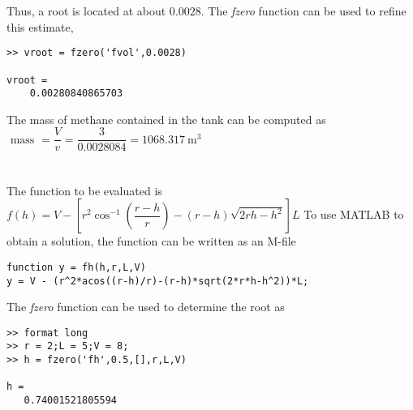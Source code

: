 \documentclass[../main.tex]{subfiles}
\begin{document}
\begin{enumerate}[label=\bfseries(\alph*)]
Thus, a root is located at about $0.0028$. The \textit {fzero} function can be used to refine this estimate,
\bigbreak
\begin{lstlisting}[numbers=none]
>> vroot = fzero('fvol',0.0028)

vroot =
    0.00280840865703
\end{lstlisting}
\bigbreak
The mass of methane contained in the tank can be computed as
\bigbreak
$\text { mass }=\dfrac{V}{v}=\dfrac{3}{0.0028084}=1068.317 \mathrm{~m}^{3}$
\bigbreak


\section{}
The function to be evaluated is
\bigbreak
$f(h)=V-\left[r^{2} \cos ^{-1}\left(\dfrac{r-h}{r}\right)-(r-h) \sqrt{2 r h-h^{2}}\right] L$
\bigbreak
To use MATLAB to obtain a solution, the function can be written as an M-file
\bigbreak
\begin{lstlisting}[numbers=none]
function y = fh(h,r,L,V)
y = V - (r^2*acos((r-h)/r)-(r-h)*sqrt(2*r*h-h^2))*L;
\end{lstlisting}
\bigbreak
The \textit {fzero} function can be used to determine the root as
\bigbreak
\begin{lstlisting}[numbers=none]
>> format long
>> r = 2;L = 5;V = 8;
>> h = fzero('fh',0.5,[],r,L,V)

h =
   0.74001521805594 
\end{lstlisting}
\bigbreak
\end{enumerate}
\end{document}
